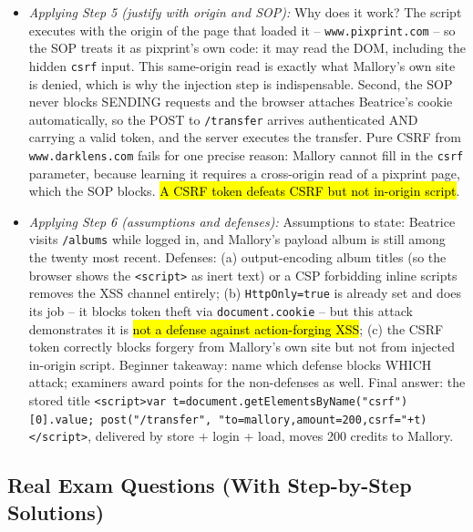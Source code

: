 \documentclass[12pt, a4paper]{article}
\newcommand{\imp}[1]{\hl{#1}}                       %
\begin{document}
\begin{itemize}
    \item \textit{Applying Step 5 (justify with origin and SOP):} Why does it work? The script executes with the origin of the page that loaded it -- \texttt{www.pixprint.com} -- so the SOP treats it as pixprint's own code: it may read the DOM, including the hidden \texttt{csrf} input. This same-origin read is exactly what Mallory's own site is denied, which is why the injection step is indispensable. Second, the SOP never blocks SENDING requests and the browser attaches Beatrice's cookie automatically, so the POST to \texttt{/transfer} arrives authenticated AND carrying a valid token, and the server executes the transfer. Pure CSRF from \texttt{www.darklens.com} fails for one precise reason: Mallory cannot fill in the \texttt{csrf} parameter, because learning it requires a cross-origin read of a pixprint page, which the SOP blocks. \imp{A CSRF token defeats CSRF but not in-origin script}.
    \item \textit{Applying Step 6 (assumptions and defenses):} Assumptions to state: Beatrice visits \texttt{/albums} while logged in, and Mallory's payload album is still among the twenty most recent. Defenses: (a) output-encoding album titles (so the browser shows the \texttt{<script>} as inert text) or a CSP forbidding inline scripts removes the XSS channel entirely; (b) \texttt{HttpOnly=true} is already set and does its job -- it blocks token theft via \texttt{document.cookie} -- but this attack demonstrates it is \imp{not a defense against action-forging XSS}; (c) the CSRF token correctly blocks forgery from Mallory's own site but not from injected in-origin script. Beginner takeaway: name which defense blocks WHICH attack; examiners award points for the non-defenses as well. Final answer: the stored title \texttt{<script>var t=document.getElementsByName("csrf")[0].value; post("/transfer", "to=mallory,amount=200,csrf="+t)</script>}, delivered by store + login + load, moves 200 credits to Mallory.
\end{itemize}

\subsection*{Real Exam Questions (With Step-by-Step Solutions)}
\end{document}
